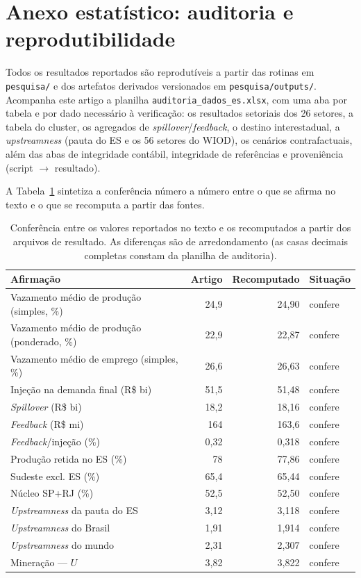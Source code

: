 \documentclass[11pt,a4paper]{article}
\begin{document}
\appendix
\section{Anexo estatístico: auditoria e reprodutibilidade}
\label{ap:auditoria}

Todos os resultados reportados são reprodutíveis a partir das rotinas em
\texttt{pesquisa/} e dos artefatos derivados versionados em
\texttt{pesquisa/outputs/}. Acompanha este artigo a planilha
\texttt{auditoria\_dados\_es.xlsx}, com uma aba por tabela e por dado
necessário à verificação: os resultados setoriais dos 26 setores, a tabela do
cluster, os agregados de \emph{spillover}/\emph{feedback}, o destino
interestadual, a \emph{upstreamness} (pauta do ES e os 56 setores do WIOD), os
cenários contrafactuais, além das abas de integridade contábil, integridade de
referências e proveniência (script $\to$ resultado).

A Tabela~\ref{tab:auditoria} sintetiza a conferência número a número entre o
que se afirma no texto e o que se recomputa a partir das fontes.

\begin{table}[ht]
\centering\small
\begin{tabular}{lrrl}
\toprule
Afirmação & Artigo & Recomputado & Situação\\
\midrule
Vazamento médio de produção (simples, \%) & 24,9 & 24,90 & confere\\
Vazamento médio de produção (ponderado, \%) & 22,9 & 22,87 & confere\\
Vazamento médio de emprego (simples, \%) & 26,6 & 26,63 & confere\\
Injeção na demanda final (R\$ bi) & 51,5 & 51,48 & confere\\
\emph{Spillover} (R\$ bi) & 18,2 & 18,16 & confere\\
\emph{Feedback} (R\$ mi) & 164 & 163,6 & confere\\
\emph{Feedback}/injeção (\%) & 0,32 & 0,318 & confere\\
Produção retida no ES (\%) & 78 & 77,86 & confere\\
Sudeste excl. ES (\%) & 65,4 & 65,44 & confere\\
Núcleo SP+RJ (\%) & 52,5 & 52,50 & confere\\
\emph{Upstreamness} da pauta do ES & 3,12 & 3,118 & confere\\
\emph{Upstreamness} do Brasil & 1,91 & 1,914 & confere\\
\emph{Upstreamness} do mundo & 2,31 & 2,307 & confere\\
Mineração --- $U$ & 3,82 & 3,822 & confere\\
\bottomrule
\end{tabular}
\caption{Conferência entre os valores reportados no texto e os recomputados a
partir dos arquivos de resultado. As diferenças são de arredondamento
(as casas decimais completas constam da planilha de auditoria).}
\label{tab:auditoria}
\end{table}
\end{document}

